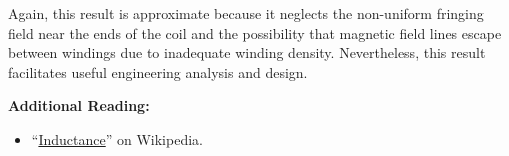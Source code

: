 Again, this result is approximate because it neglects the non-uniform fringing field near the ends of the coil and the possibility that magnetic field lines escape between windings due to inadequate winding density.
Nevertheless, this result facilitates useful engineering analysis and design.


{\bf Additional Reading:}
\begin{itemize}
\item ``\href{https://en.wikipedia.org/wiki/Inductance}{Inductance}'' on Wikipedia.
\end{itemize}

